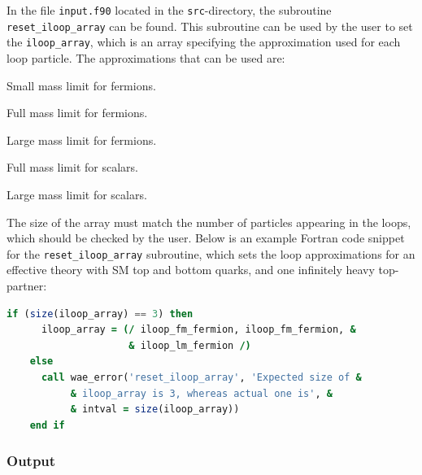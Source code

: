 \documentclass[12pt]{article}
\begin{document}
In the file \texttt{input.f90} located in the \texttt{src}-directory, the subroutine \texttt{reset\_iloop\_array} can be found. This subroutine can be used by the user to set the \texttt{iloop\_array}, which is an array specifying the approximation used for each loop particle. The approximations that can be used are: 
\begin{description}[labelindent=1cm, labelwidth =\widthof{\bfseries9999999999999999999}, leftmargin = !] 
	\item[\texttt{iloop\_sm\_fermion}] Small mass limit for fermions. 
	\item[\texttt{iloop\_fm\_fermion}] Full mass limit for fermions. 
	\item[\texttt{iloop\_lm\_fermion}] Large mass limit for fermions. 
	\item[\texttt{iloop\_fm\_scalar}] Full mass limit for scalars. 
	\item[\texttt{iloop\_lm\_scalar}] Large mass limit for scalars. 
\end{description}
The size of the array must match the number of particles appearing in the loops, which should be checked by the user. Below is an example Fortran code snippet for the \texttt{reset\_iloop\_array} subroutine, which sets the loop approximations for an effective theory with SM top and bottom quarks, and one infinitely heavy top-partner: 
\begin{lstlisting}[language=Fortran, 
                   keywordstyle=\color{Red},
                   stringstyle=\color{Green},
                   identifierstyle=\color{Blue},
                   showstringspaces=false]
    if (size(iloop_array) == 3) then
      iloop_array = (/ iloop_fm_fermion, iloop_fm_fermion, &
                     & iloop_lm_fermion /)
    else
      call wae_error('reset_iloop_array', 'Expected size of &
           & iloop_array is 3, whereas actual one is', &
           & intval = size(iloop_array))
    end if
\end{lstlisting}

\subsubsection{Output} 
\end{document}
